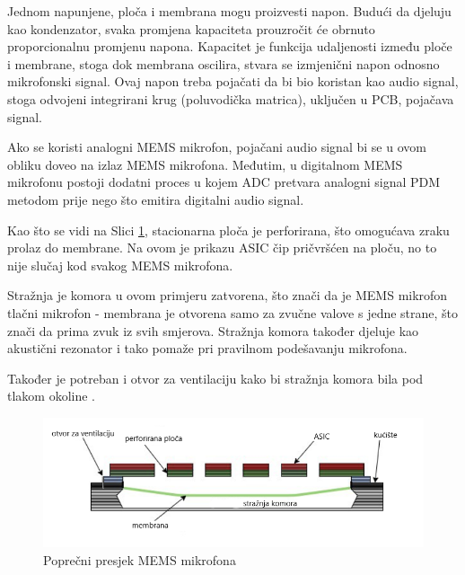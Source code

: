 Jednom napunjene, ploča i membrana mogu proizvesti napon. Budući da djeluju kao kondenzator, svaka promjena kapaciteta prouzročit će obrnuto proporcionalnu promjenu napona. Kapacitet je funkcija udaljenosti između ploče i membrane, stoga dok membrana oscilira, stvara se izmjenični napon odnosno mikrofonski signal. Ovaj napon treba pojačati da bi bio koristan kao audio signal, stoga odvojeni integrirani krug (poluvodička matrica), uključen u PCB, pojačava signal.

Ako se koristi analogni MEMS mikrofon, pojačani audio signal bi se u ovom obliku doveo na izlaz MEMS mikrofona.  Međutim, u digitalnom MEMS mikrofonu postoji dodatni proces u kojem ADC pretvara analogni signal PDM metodom prije nego što emitira digitalni audio signal.

Kao što se vidi na Slici \ref{fig:mems-mic}, stacionarna ploča je perforirana, što omogućava zraku prolaz do membrane. Na ovom je prikazu ASIC čip pričvršćen na ploču, no to nije slučaj kod svakog MEMS mikrofona. 

Stražnja je komora u ovom primjeru zatvorena, što znači da je MEMS mikrofon tlačni mikrofon - membrana je otvorena samo za zvučne valove s jedne strane, što znači da prima zvuk iz svih smjerova. Stražnja komora također djeluje kao akustični rezonator i tako pomaže pri pravilnom podešavanju mikrofona.

Također je potreban i otvor za ventilaciju kako bi stražnja komora bila pod tlakom okoline \cite{memsdepth}.

\begin{figure}[ht]
	\includegraphics[width=\linewidth]{imgs/mems_mic}
	\caption{Poprečni presjek MEMS mikrofona \cite{memsdepth}}
	\label{fig:mems-mic}
\end{figure}